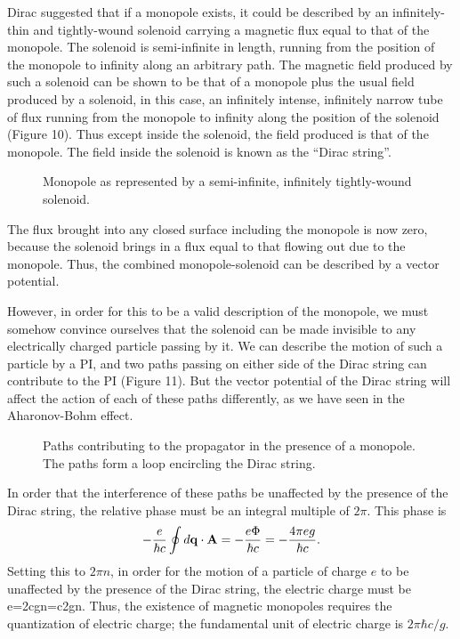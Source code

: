\documentclass[12pt]{article}
\begin{document}
Dirac suggested that if a monopole exists, it could be described by an
infinitely-thin and tightly-wound solenoid carrying a magnetic flux
equal to that of the monopole. The solenoid is semi-infinite in
length, running from the position of the monopole to infinity along an
arbitrary path. The magnetic
field produced by such a solenoid can be shown to be that of a
monopole plus the usual field produced by a solenoid, in this case,
an infinitely intense, infinitely narrow tube of flux running from the
monopole to infinity along the position of the solenoid
(Figure 10). Thus except inside the solenoid,
the field produced is that of the monopole. The field inside the
solenoid is known as the ``Dirac string''.
\begin{figure}[ht]
\epsfysize=7cm
\centerline{}
\caption{Monopole as represented by a semi-infinite, infinitely
  tightly-wound solenoid.}
\end{figure}
The flux brought into any closed surface including the monopole is
now zero, because the solenoid brings in a flux equal to that
flowing out due to the monopole. Thus, the combined monopole-solenoid
can be described by a vector potential.

However, in order for this to be a valid description of the monopole,
we must somehow convince
ourselves that the solenoid can be made invisible to any electrically
charged particle
passing by it. We can describe the motion of
such a particle by a PI, and
two paths passing on either side of the Dirac string can contribute to
the PI (Figure 11). But the vector potential of the Dirac string will
affect the action of each of these paths differently, as we have seen
in the Aharonov-Bohm effect.
\begin{figure}[ht]
\epsfysize=4cm
\centerline{}
\caption{Paths contributing to the propagator in the presence of a
  monopole. The paths form a loop encircling the Dirac string.}
\end{figure}

In order that the interference of these paths be unaffected by the
presence of the Dirac string, the relative phase must be an integral
multiple of $2\pi$. This phase is
\[ -{e\over\hbar c}\oint d{\mathbf q}\cdot{\mathbf A}=-{e\Phi\over\hbar c}
=-{4\pi eg\over\hbar c}.
\]
Setting this to $2\pi n$, in order for the motion of a particle of
charge $e$ to be unaffected by the presence of the Dirac string, the
electric charge must be
\beq
e={2\pi\hbar c\pi g}n={\hbar c\over2g}n.
\label{quantcond}
\eeq
Thus, the existence of magnetic monopoles requires the quantization of
electric charge; the fundamental unit of electric charge is $2\pi\hbar
c/g$.
\end{document}
